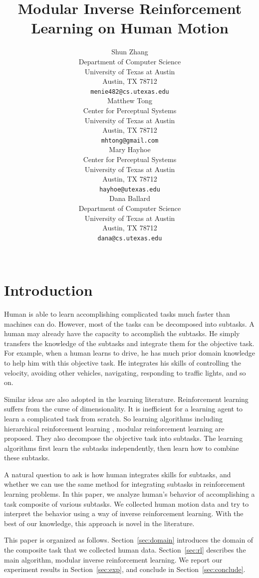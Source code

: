\documentclass[11pt]{article} %
\title{Modular Inverse Reinforcement Learning on Human Motion}
\author{
Shun Zhang\\
Department of Computer Science\\
University of Texas at Austin\\
Austin, TX 78712 \\
\texttt{menie482@cs.utexas.edu} \\
\And
Matthew Tong \\
Center for Perceptual Systems\\
University of Texas at Austin\\
Austin, TX 78712 \\
\texttt{mhtong@gmail.com} \\
\AND
Mary Hayhoe \\
Center for Perceptual Systems\\
University of Texas at Austin\\
Austin, TX 78712 \\
\texttt{hayhoe@utexas.edu} \\
\And
Dana Ballard \\
Department of Computer Science\\
University of Texas at Austin\\
Austin, TX 78712 \\
\texttt{dana@cs.utexas.edu} \\
\\
}
\begin{document}
\maketitle

\begin{abstract}
\end{abstract}


\startmain %

\section{Introduction}

Human is able to learn accomplishing complicated tasks much faster than machines
can do. However, most of the tasks can be decomposed into subtasks. A human may
already have the capacity to accomplish the subtasks. He simply transfers the
knowledge of the subtasks and integrate them for the objective task. For example,
when a human learns to drive, he has much prior domain knowledge to help him
with this objective task. He integrates his skills of controlling the velocity,
avoiding other vehicles, navigating, responding to traffic lights, and so on.

Similar ideas are also adopted in the learning literature. Reinforcement learning
suffers from the curse of dimensionality. It is inefficient for a learning agent
to learn a complicated task from scratch. So learning algorithms including
hierarchical reinforcement learning \cite{dietterich2000hierarchical}, modular
reinforcement learning \cite{sprague2003multiple} are proposed. They also
decompose the objective task into subtasks. The learning algorithms first learn
the subtasks independently, then learn how to combine these subtasks.

A natural question to ask is how human integrates skills for subtasks, and
whether we can use the same method for integrating subtasks in reinforcement
learning problems. In this paper, we analyze human's behavior of
accomplishing a task composite of various subtasks. We collected human motion
data and try to interpret the behavior using a way of
inverse reinforcement learning. With the best of our knowledge, this approach is
novel in the literature.

This paper is organized as follows. Section~\ref{sec:domain} introduces the
domain of the composite task that we collected human data. Section~\ref{sec:rl}
describes the main algorithm, modular inverse reinforcement learning. We report
our experiment results in Section~\ref{sec:exp}, and conclude in
Section~\ref{sec:conclude}.
\end{document}
